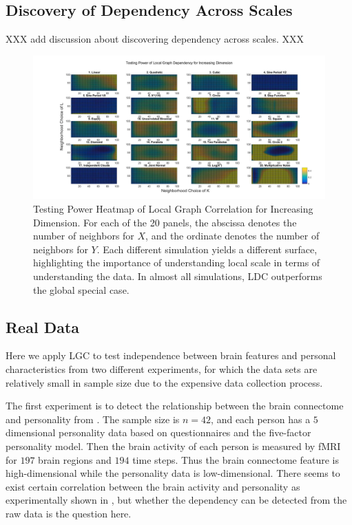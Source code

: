 \documentclass[11pt]{article}
\begin{document}
\subsection{Discovery of Dependency Across Scales}


XXX add discussion about discovering dependency across scales. XXX

\begin{figure}[htbp]
\includegraphics[width=1.0\textwidth]{../Figures/Fig6s}
\caption{Testing Power Heatmap of Local Graph Correlation for Increasing Dimension.
For each of the 20 panels, the abscissa denotes the number of neighbors for $X$, and the ordinate denotes the number of neighbors for $Y$.  Each different simulation yields a different surface, highlighting the importance of understanding local scale in terms of understanding the data. In almost all simulations, LDC outperforms the global special case.}
\label{figSim2}
\end{figure}







\subsection{Real Data}
\label{numer2}
Here we apply LGC to test independence between brain features and personal characteristics from two different experiments, for which the data sets are relatively small in sample size due to the expensive data collection process. 

The first experiment is to detect the relationship between the brain connectome and personality from \cite{AdelsteinEtAl2011}. The sample size is $n=42$, and each person has a $5$ dimensional personality data based on questionnaires and the five-factor personality model. Then the brain activity of each person is measured by fMRI for $197$ brain regions and $194$ time steps. Thus the brain connectome feature is high-dimensional while the personality data is low-dimensional. There seems to exist certain correlation between the brain activity and personality as experimentally shown in \cite{AdelsteinEtAl2011}, but whether the dependency can be detected from the raw data is the question here.
\end{document}
